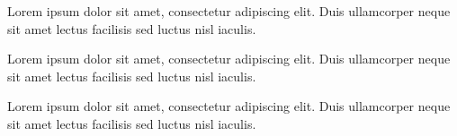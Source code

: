 \documentclass[11pt, a4paper]{awesome-cv}
\begin{document}
\makecvheader[R]
\makecvfooter{}{}{}
\makelettertitle

\begin{cvletter}

Lorem ipsum dolor sit amet, consectetur adipiscing elit. Duis ullamcorper neque sit amet lectus facilisis sed luctus nisl iaculis.

Lorem ipsum dolor sit amet, consectetur adipiscing elit. Duis ullamcorper neque sit amet lectus facilisis sed luctus nisl iaculis.

Lorem ipsum dolor sit amet, consectetur adipiscing elit. Duis ullamcorper neque sit amet lectus facilisis sed luctus nisl iaculis.

\end{cvletter}

\makeletterclosing
\end{document}
